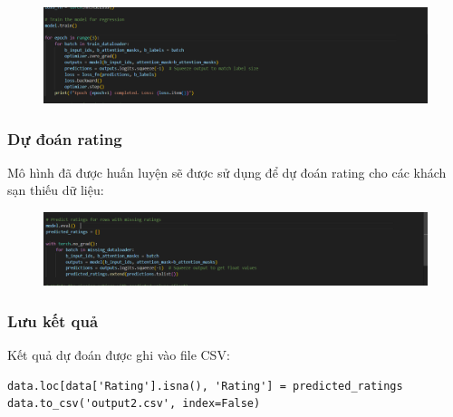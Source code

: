 \begin{figure}[H]
        \centering
        \includegraphics[width=1\linewidth]{Figures/9.3.png}
        \label{fig:enter-label}
    \end{figure}

\subsubsection{Dự đoán rating}
Mô hình đã được huấn luyện sẽ được sử dụng để dự đoán rating cho các khách sạn thiếu dữ liệu:

\begin{figure}[H]
        \centering
        \includegraphics[width=1\linewidth]{Figures/9.4.png}
        \label{fig:enter-label}
    \end{figure}

\subsubsection{Lưu kết quả}
Kết quả dự đoán được ghi vào file CSV:

\begin{verbatim}
data.loc[data['Rating'].isna(), 'Rating'] = predicted_ratings
data.to_csv('output2.csv', index=False)
\end{verbatim}

